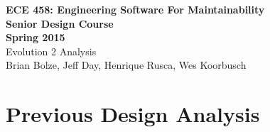\documentclass[11pt]{article}
\begin{document}
\begin{center}
\textbf{ECE 458: Engineering Software For Maintainability \\
Senior Design Course\\
Spring 2015\\[0.2in]}
Evolution 2 Analysis\\
Brian Bolze, Jeff Day, Henrique Rusca, Wes Koorbusch
\end{center}

\singlespacing
\tableofcontents





\pagebreak

\section{Previous Design Analysis}
\end{document}
